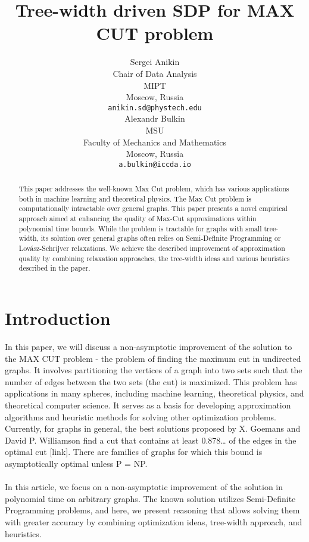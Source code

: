 \documentclass{article}
\author{ Sergei Anikin \\
	Chair of Data Analysis\\
	MIPT\\
    Moscow, Russia\\
	\texttt{anikin.sd@phystech.edu} \\
	\And
	Alexandr Bulkin \\
	MSU \\
    Faculty of Mechanics and Mathematics \\
	Moscow, Russia\\
    \texttt{a.bulkin@iccda.io} \\
}
\date{}
\begin{document}
\title{Tree-width driven SDP for MAX CUT problem
}
\maketitle
\begin{abstract}
	This paper addresses the well-known Max Cut problem, which has various applications both in machine learning and theoretical physics. The Max Cut problem is computationally intractable over general graphs. This paper presents a novel empirical approach aimed at enhancing the quality of Max-Cut approximations within polynomial time bounds. While the problem is tractable for graphs with small tree-width, its solution over general graphs often relies on Semi-Definite Programming or Lovász-Schrijver relaxations. We achieve the described improvement of approximation quality by combining relaxation approaches, the tree-width ideas and various heuristics described in the paper.




\end{abstract}



\section{Introduction}
In this paper, we will discuss a non-asymptotic improvement of the solution to the MAX CUT problem - the problem of finding the maximum cut in  undirected graphs. It involves partitioning the vertices of a graph into two sets such that the number of edges between the two sets (the cut) is maximized. This problem has applications in many spheres, including machine learning, theoretical physics, and theoretical computer science. It serves as a basis for developing approximation algorithms and heuristic methods for solving other optimization problems. Currently, for graphs in general, the best solutions proposed by X. Goemans and David P. Williamson find a cut that contains at least 0.878… of the edges in the optimal cut [link]. There are families of graphs for which this bound is asymptotically optimal unless P = NP.
\\
\\
In this article, we focus on a non-asymptotic improvement of the solution in polynomial time on arbitrary graphs. The known solution utilizes Semi-Definite Programming problems, and here, we present reasoning that allows solving them with greater accuracy by combining optimization ideas, tree-width approach, and heuristics.
\end{document}
